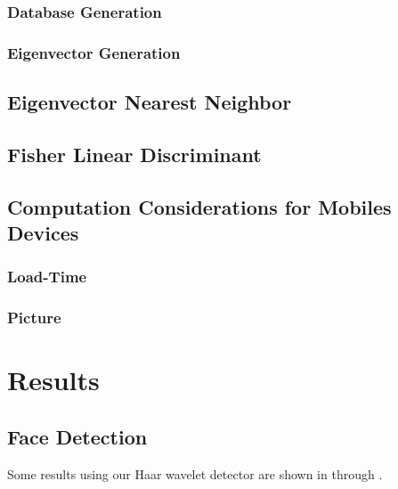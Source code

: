 \subsubsection{Database Generation}
\subsubsection{Eigenvector Generation}



\subsection{Eigenvector Nearest Neighbor}



\subsection{Fisher Linear Discriminant}




\subsection{Computation Considerations for Mobiles Devices}


\subsubsection{Load-Time}
\subsubsection{Picture}



\section{Results} %

\subsection{Face Detection}


Some results using our Haar wavelet detector are shown in
 through .


